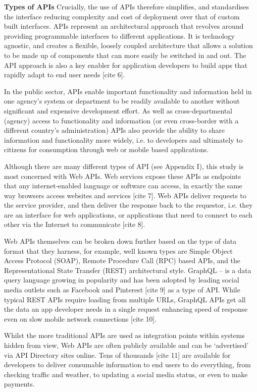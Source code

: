 \textbf{Types of APIs}
Crucially, the use of APIs therefore simplifies, and standardises the interface
reducing complexity and cost of deployment over that of custom built interfaces.
APIs represent an architectural approach that revolves around providing
programmable interfaces to different applications. It is technology agnostic,
and creates a flexible, loosely coupled architecture that allows a solution to be
made up of components that can more easily be switched in and out. The API approach
is also a key enabler for application developers to build apps that rapidly adapt
to end user needs [cite 6]. 

In the public sector, APIs enable important functionality and information held in
one agency’s system or department to be readily available to another without
significant and expensive development effort. As well as cross-departmental
(agency) access to functionality and information (or even cross-border with a
different country’s administration) APIs also provide the ability to share
information and functionality more widely, i.e. to developers and ultimately
to citizens for consumption through web or mobile based applications.

Although there are many different types of API (see Appendix I), this study is
most concerned with Web APIs. Web services expose these APIs as endpoints that
any internet-enabled language or software can access, in exactly the same way
browsers access websites and services [cite 7]. Web APIs deliver requests to the
service provider, and then deliver the response back to the requestor,
i.e. they are an interface for web applications, or applications that need to
connect to each other via the Internet to communicate [cite 8].

Web APIs themselves can be broken down further based on the type of data format
that they harness, for example, well known types are Simple Object Access Protocol
(SOAP), Remote Procedure Call (RPC) based APIs, and the Representational State
Transfer (REST) architectural style. GraphQL – is a data query language growing
in popularity and has been adopted by leading social media outlets such as Facebook
and Pinterest [cite 9] as a type of API. While typical REST APIs require loading
from multiple URLs, GraphQL APIs get all the data an app developer needs in a single
request enhancing speed of response even on slow mobile network connections [cite 10].

Whilst the more traditional APIs are used as integration points within systems
hidden from view, Web APIs are often publicly available and can be ‘advertised’
via API Directory sites online. Tens of thousands [cite 11] are available for developers
to deliver consumable information to end users to do everything, from checking
traffic and weather, to updating a social media status, or even to make payments.

